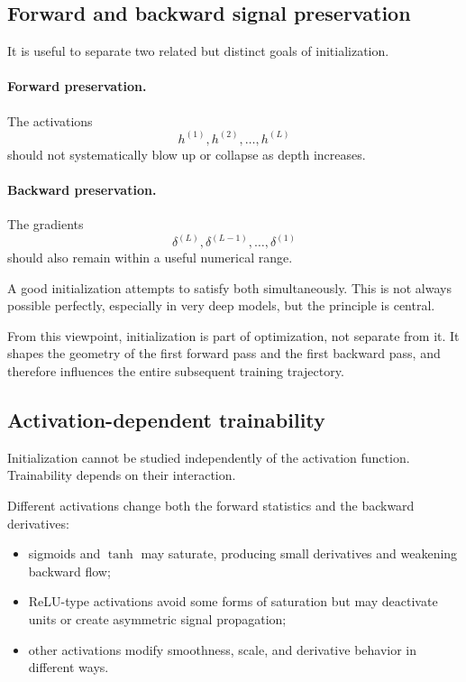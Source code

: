 \subsection*{Forward and backward signal preservation}

It is useful to separate two related but distinct goals of initialization.

\paragraph{Forward preservation.}
The activations
\[
h^{(1)},h^{(2)},\dots,h^{(L)}
\]
should not systematically blow up or collapse as depth increases.

\paragraph{Backward preservation.}
The gradients
\[
\delta^{(L)},\delta^{(L-1)},\dots,\delta^{(1)}
\]
should also remain within a useful numerical range.

\medskip

A good initialization attempts to satisfy both simultaneously.
This is not always possible perfectly, especially in very deep models, but the principle is central.

\medskip

From this viewpoint, initialization is part of optimization, not separate from it.
It shapes the geometry of the first forward pass and the first backward pass, and therefore influences the entire subsequent training trajectory.

\subsection*{Activation-dependent trainability}

Initialization cannot be studied independently of the activation function.
Trainability depends on their interaction.

\medskip

Different activations change both the forward statistics and the backward derivatives:
\begin{itemize}
    \item sigmoids and $\tanh$ may saturate, producing small derivatives and weakening backward flow;
    \item ReLU-type activations avoid some forms of saturation but may deactivate units or create asymmetric signal propagation;
    \item other activations modify smoothness, scale, and derivative behavior in different ways.
\end{itemize}

